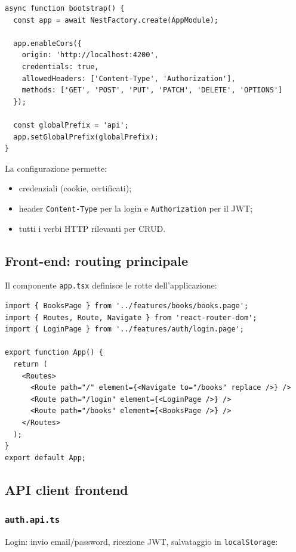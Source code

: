 \documentclass[11pt,a4paper]{article}
\begin{document}
\begin{lstlisting}[language=tsx]
async function bootstrap() {
  const app = await NestFactory.create(AppModule);

  app.enableCors({
    origin: 'http://localhost:4200',
    credentials: true,
    allowedHeaders: ['Content-Type', 'Authorization'],
    methods: ['GET', 'POST', 'PUT', 'PATCH', 'DELETE', 'OPTIONS']
  });

  const globalPrefix = 'api';
  app.setGlobalPrefix(globalPrefix);
}
\end{lstlisting}

La configurazione permette:
\begin{itemize}[leftmargin=*]
    \item credenziali (cookie, certificati);
    \item header \texttt{Content-Type} per la login e \texttt{Authorization} per il JWT;
    \item tutti i verbi HTTP rilevanti per CRUD.
\end{itemize}

\subsection{Front-end: routing principale}

Il componente \texttt{app.tsx} definisce le rotte dell'applicazione:

\begin{lstlisting}[language=tsx]
import { BooksPage } from '../features/books/books.page';
import { Routes, Route, Navigate } from 'react-router-dom';
import { LoginPage } from '../features/auth/login.page';

export function App() {
  return (
    <Routes>
      <Route path="/" element={<Navigate to="/books" replace />} />
      <Route path="/login" element={<LoginPage />} />
      <Route path="/books" element={<BooksPage />} />
    </Routes>
  );
}
export default App;
\end{lstlisting}

\subsection{API client frontend}

\subsubsection{\texttt{auth.api.ts}}
Login: invio email/password, ricezione JWT, salvataggio in \texttt{localStorage}:
\end{document}
